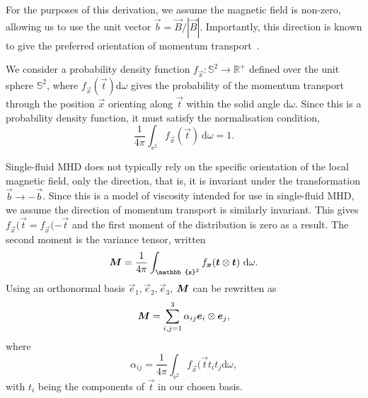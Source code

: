 For the purposes of this derivation, we assume the magnetic field is non-zero, allowing us to use the unit vector $\vec{b} = \vec{B}/|\vec{B}|$. Importantly, this direction is known to give the preferred orientation of momentum transport~\cite{braginskiiTransportProcessesPlasma1965}.

We consider a probability density function $f_{\vec{x}} : \mathbb{S}^2 \to \mathbb{R}^+$ defined over the unit sphere $\mathbb{S}^2$, where $f_\vec{x}(\vec{t}) \text{d}\omega$ gives the probability of the momentum transport through the position $\vec{x}$ orienting along $\vec{t}$ within the solid angle d$\omega$. Since this is a probability density function, it must satisfy the normalisation condition,
\begin{equation}
  \label{eq:normalisation_condition}
  \frac{1}{4\pi} \int_{\mathbb{s}^2} f_\vec{x}(\vec{t})\ \text{d}\omega = 1.
\end{equation}

Single-fluid MHD does not typically rely on the specific orientation of the local magnetic field, only the direction, that is, it is invariant under the transformation $\vec{b} \to -\vec{b}$. Since this is a model of viscosity intended for use in single-fluid MHD, we assume the direction of momentum transport is similarly invariant. This gives $f_\vec{x}(\vec{t} = f_\vec{x}(-\vec{t}$ and the first moment of the distribution is zero as a result. The second moment is the variance tensor, written
\begin{equation}
  \label{eq:variance_tensor}
\ten{M} = \frac{1}{4\pi} \int_{\mathbb{s}^2} f_\vec{x}(\vec{t} \otimes \vec{t}) \ \text{d}\omega.
\end{equation}
Using an orthonormal basis ${\vec{e}_1, \vec{e}_2, \vec{e}_3}$, ${\bm M}$ can be rewritten as
\begin{equation}
  \label{eq:variance_tensor_basis}
  {\bm M} = \sum_{i,j=1}^{3} \alpha_{ij} {\bm e}_i \otimes {\bm e}_j,
\end{equation}
where
\begin{equation}
  \label{eq:variance_components}
\alpha_{ij} = \frac{1}{4\pi} \int_{\mathbb{s}^2} f_\vec{x}(\vec{t} t_i t_j \text{d}\omega,
\end{equation}
with $t_i$ being the components of $\vec{t}$ in our chosen basis.

